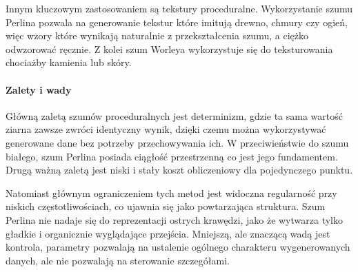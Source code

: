 Innym kluczowym zastosowaniem są tekstury proceduralne. Wykorzystanie szumu Perlina pozwala na generowanie tekstur które imitują drewno, chmury czy ogień, więc wzory które wynikają naturalnie z przekształcenia szumu, a ciężko odwzorować ręcznie. Z kolei szum Worleya wykorzystuje się do teksturowania chociażby kamienia lub skóry.


\paragraph{Zalety i wady}
Główną zaletą szumów proceduralnych jest determinizm, gdzie ta sama wartość ziarna zawsze zwróci identyczny wynik, dzięki czemu można wykorzystywać generowane dane bez potrzeby przechowywania ich. W przeciwieństwie do szumu białego, szum Perlina posiada ciągłość przestrzenną co jest jego fundamentem. Drugą ważną zaletą jest niski i stały koszt obliczeniowy dla pojedynczego punktu.

Natomiast głównym ograniczeniem tych metod jest widoczna regularność przy niskich częstotliwościach, co ujawnia się jako powtarzająca struktura. Szum Perlina nie nadaje się do reprezentacji ostrych krawędzi, jako że wytwarza tylko gładkie i organicznie wyglądające przejścia. Mniejszą, ale znaczącą wadą jest kontrola, parametry pozwalają na ustalenie ogólnego charakteru wygenerowanych danych, ale nie pozwalają na sterowanie szczegółami.